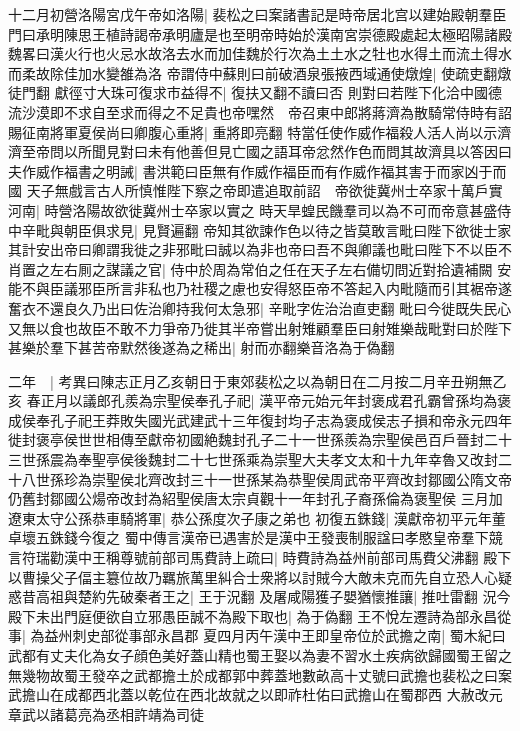 十二月初營洛陽宮戊午帝如洛陽|{
	裴松之曰案諸書記是時帝居北宫以建始殿朝羣臣門曰承明陳思王植詩謁帝承明廬是也至明帝時始於漢南宮崇德殿處起太極昭陽諸殿魏畧曰漢火行也火忌水故洛去水而加佳魏於行次為土土水之牡也水得土而流土得水而柔故除佳加水變雒為洛}
帝謂侍中蘇則曰前破酒泉張掖西域通使燉煌|{
	使疏吏翻燉徒門翻}
獻徑寸大珠可復求市益得不|{
	復扶又翻不讀曰否}
則對曰若陛下化洽中國德流沙漠即不求自至求而得之不足貴也帝嘿然　帝召東中郎將蔣濟為散騎常侍時有詔賜征南將軍夏侯尚曰卿腹心重將|{
	重將即亮翻}
特當任使作威作福殺人活人尚以示濟濟至帝問以所聞見對曰未有他善但見亡國之語耳帝忿然作色而問其故濟具以答因曰夫作威作福書之明誡|{
	書洪範曰臣無有作威作福臣而有作威作福其害于而家凶于而國}
天子無戲言古人所慎惟陛下察之帝即遣追取前詔　帝欲徙冀州士卒家十萬戶實河南|{
	時營洛陽故欲徙冀州士卒家以實之}
時天旱蝗民饑羣司以為不可而帝意甚盛侍中辛毗與朝臣俱求見|{
	見賢遍翻}
帝知其欲諫作色以待之皆莫敢言毗曰陛下欲徙士家其計安出帝曰卿謂我徙之非邪毗曰誠以為非也帝曰吾不與卿議也毗曰陛下不以臣不肖置之左右厠之謀議之官|{
	侍中於周為常伯之任在天子左右備切問近對拾遺補闕}
安能不與臣議邪臣所言非私也乃社稷之慮也安得怒臣帝不答起入内毗隨而引其裾帝遂奮衣不還良久乃出曰佐治卿持我何太急邪|{
	辛毗字佐治治直吏翻}
毗曰今徙既失民心又無以食也故臣不敢不力爭帝乃徙其半帝嘗出射雉顧羣臣曰射雉樂哉毗對曰於陛下甚樂於羣下甚苦帝默然後遂為之稀出|{
	射而亦翻樂音洛為于偽翻}


二年　|{
	考異曰陳志正月乙亥朝日于東郊裴松之以為朝日在二月按二月辛丑朔無乙亥}
春正月以議郎孔羨為宗聖侯奉孔子祀|{
	漢平帝元始元年封褒成君孔霸曾孫均為褒成侯奉孔子祀王莽敗失國光武建武十三年復封均子志為褒成侯志子損和帝永元四年徙封褒亭侯世世相傳至獻帝初國絶魏封孔子二十一世孫羨為宗聖侯邑百戶晉封二十三世孫震為奉聖亭侯後魏封二十七世孫乘為崇聖大夫孝文太和十九年幸魯又改封二十八世孫珍為崇聖侯北齊改封三十一世孫某為恭聖侯周武帝平齊改封鄒國公隋文帝仍舊封鄒國公煬帝改封為紹聖侯唐太宗貞觀十一年封孔子裔孫倫為褒聖侯}
三月加遼東太守公孫恭車騎將軍|{
	恭公孫度次子康之弟也}
初復五銖錢|{
	漢獻帝初平元年董卓壞五銖錢今復之}
蜀中傳言漢帝已遇害於是漢中王發喪制服諡曰孝愍皇帝羣下競言符瑞勸漢中王稱尊號前部司馬費詩上疏曰|{
	時費詩為益州前部司馬費父沸翻}
殿下以曹操父子偪主簒位故乃羈旅萬里糾合士衆將以討賊今大敵未克而先自立恐人心疑惑昔高祖與楚約先破秦者王之|{
	王于況翻}
及屠咸陽獲子嬰猶懷推讓|{
	推吐雷翻}
況今殿下未出門庭便欲自立邪愚臣誠不為殿下取也|{
	為于偽翻}
王不悅左遷詩為部永昌從事|{
	為益州刺史部從事部永昌郡}
夏四月丙午漢中王即皇帝位於武擔之南|{
	蜀木紀曰武都有丈夫化為女子顔色美好蓋山精也蜀王娶以為妻不習水土疾病欲歸國蜀王留之無幾物故蜀王發卒之武都擔土於成都郭中葬蓋地數畝高十丈號曰武擔也裴松之曰案武擔山在成都西北蓋以乾位在西北故就之以即祚杜佑曰武擔山在蜀郡西}
大赦改元章武以諸葛亮為丞相許靖為司徒

